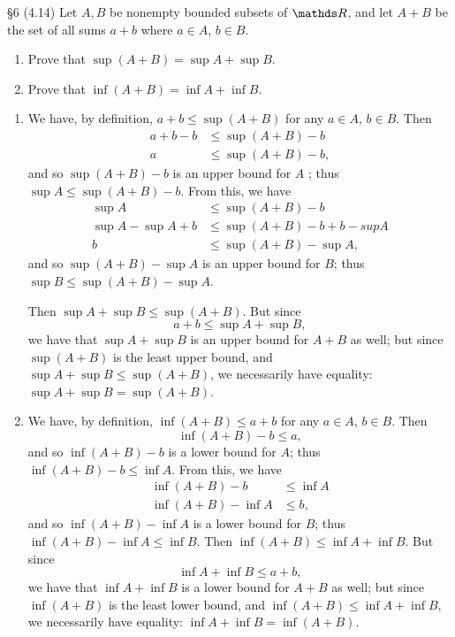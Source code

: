 \documentclass{homework}
\begin{document}
\begin{problem}{\S 6}
  (4.14) Let $A,B$ be nonempty bounded subsets of $ \R$, and let $A+B$ be the set of all sums $a+b$ 
  where $a\in A$, $b\in B$.
  \begin{enumerate}[label=(\alph*)]
    \item Prove that $\sup{(A+B)}=\sup{A}+\sup{B}$.
    \item Prove that $\inf{(A+B)}=\inf{A}+\inf{B}$.
  \end{enumerate}
\end{problem}

\begin{solution}
  \begin{enumerate}[label=(\alph*)]
    \item 
      We have, by definition, $a+b\le \sup{(A+B)}$ for any $a\in A$, $b\in B$. Then
      \begin{align*}
        a+b-b&\le \sup{(A+B)}-b\\
        a&\le \sup{(A+B)}-b
      ,\end{align*} and so $\sup{(A+B)}-b$ is an upper bound for $A$ ; thus $\sup{A}\le \sup{(A+B)}-b$.
      From this, we have
      \begin{align*}
        \sup{A}&\le \sup{(A+B)}-b\\
        \sup{A}-\sup{A}+b&\le \sup{(A+B)}-b+b-supA\\
        b&\le \sup{(A+B)}-\sup{A}
      ,\end{align*} and so $\sup(A+B)-\sup{A}$ is an upper bound for $B$; thus $\sup{B}\le
      \sup{(A+B)}-\sup{A}$.

      Then $\sup{A}+\sup{B}\le \sup{(A+B)}$. But since \[
        a+b\le \sup{A}+\sup{B}
      ,\] we have that $\sup{A}+\sup{B}$ is an upper bound for $A+B$ as well; but since $\sup{(A+B)}$ is
      the least upper bound, and $\sup{A}+\sup{B}\le \sup{(A+B)}$, we necessarily have equality:
      $\sup{A}+\sup{B}=\sup{(A+B)}$.

    \item We have, by definition, $\inf{(A+B)}\le a+b$ for any $a\in A$, $b\in B$. Then \[
        \inf{(A+B)}-b\le a
    ,\] and so $\inf{(A+B)}-b$ is a lower bound for  $A$; thus $\inf{(A+B)}-b\le \inf{A}$. From
    this, we have
    \begin{align*}
      \inf{(A+B)}-b &\le \inf{A}\\
      \inf{(A+B)}-\inf{A}&\le b
    ,\end{align*}
    and so $\inf{(A+B)}-\inf{A}$ is a lower bound for $B$; thus $\inf{(A+B)}-\inf{A}\le \inf{B}$.
    Then $ \inf{(A+B)}\le \inf{A}+\inf{B}$. But since \[
      \inf{A}+\inf{B}\le a+b
    ,\] we have that $\inf{A}+\inf{B}$ is a lower bound for $A+B$ as well; but since $\inf{(A+B)}$
    is the least lower bound, and $\inf{(A+B)}\le \inf{A}+\inf{B}$, we necessarily have equality:
    $\inf{A}+\inf{B}=\inf{(A+B)}$.
  \end{enumerate}
\end{solution}
\end{document}
